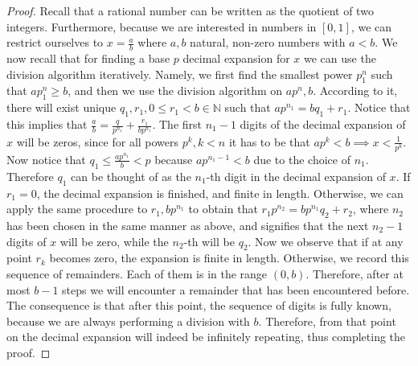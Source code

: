\begin{proof}
    Recall that a rational number can be written as the quotient of two integers. Furthermore, because we are interested in numbers in $[0, 1]$, we can restrict ourselves to $x = \frac{a}{b}$ where $a, b$ natural, non-zero numbers with $a < b$. We now recall that for finding a base $p$ decimal expansion for $x$ we can use the division algorithm iteratively. Namely, we first find the smallest power $p^n_1$ such that $ap^n_1 \geq b$, and then we use the division algorithm on $ap^n, b$. According to it, there will exist unique $q_1, r_1, 0 \leq r_1 < b \in \mathbb{N}$ such that $ap^{n_1} = bq_1 + r_1$. Notice that this implies that $\frac{a}{b} = \frac{q}{p^{n_1}} + \frac{r_1}{bp^{n_1}}$. The first $n_1-1$ digits of the decimal expansion of $x$ will be zeros, since for all powers $p^k, k<n$ it has to be that $ap^k < b \implies x < \frac{1}{p^k}$. Now notice that $q_1 \leq \frac{ap^{n_1}}{b} < p$ because $ap^{n_1-1} < b$ due to the choice of $n_1$. Therefore $q_1$ can be thought of as the $n_1$-th digit in the decimal expansion of $x$. If $r_1 = 0$, the decimal expansion is finished, and finite in length. Otherwise, we can apply the same procedure to $r_1, bp^{n_1}$ to obtain that $r_1p^{n_2} = bp^{n_1}q_2 + r_2$, where $n_2$ has been chosen in the same manner as above, and signifies that the next $n_2 - 1$ digits of $x$ will be zero, while the $n_2$-th will be $q_2$. Now we observe that if at any point $r_k$ becomes zero, the expansion is finite in length. Otherwise, we record this sequence of remainders. Each of them is in the range $(0, b)$. Therefore, after at most $b - 1$ steps we will encounter a remainder that has been encountered before. The consequence is that after this point, the sequence of digits is fully known, because we are always performing a division with $b$. Therefore, from that point on the decimal expansion will indeed be infinitely repeating, thus completing the proof.
\end{proof}

